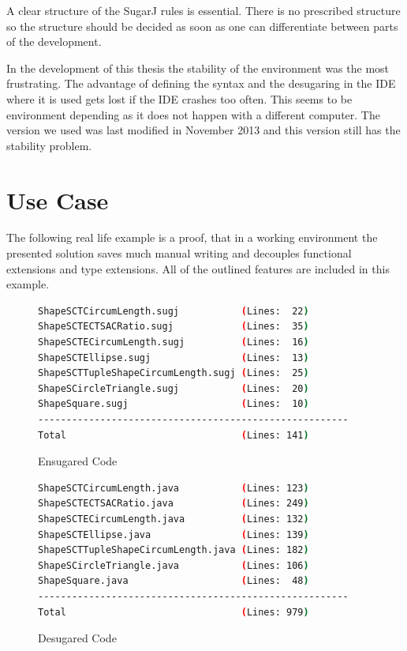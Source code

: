 \documentclass{report}
\begin{document}
A clear structure of the SugarJ rules is essential. There is no prescribed structure so the structure should be decided as soon as one can differentiate between parts of the development.

In the development of this thesis the stability of the environment was the most frustrating. The advantage of defining the syntax and the desugaring in the IDE where it is used gets lost if the IDE crashes too often. This seems to be environment depending as it does not happen with a different computer. The version we used was last modified in November 2013 and this version still has the stability problem.



\chapter{Use Case}

The following real life example is a proof, that in a working environment the presented solution saves much manual writing and decouples functional extensions and type extensions. All of the outlined features are included in this example.

\begin{figure}[h]
\begin{lstlisting}[language=bash,numbers=none]
ShapeSCTCircumLength.sugj           (Lines:  22)
ShapeSCTECTSACRatio.sugj            (Lines:  35)
ShapeSCTECircumLength.sugj          (Lines:  16)
ShapeSCTEllipse.sugj                (Lines:  13)
ShapeSCTTupleShapeCircumLength.sugj (Lines:  25)
ShapeSCircleTriangle.sugj           (Lines:  20)
ShapeSquare.sugj                    (Lines:  10)
-------------------------------------------------------
Total                               (Lines: 141)
\end{lstlisting}
\caption{Ensugared Code}
\end{figure}

\begin{figure}[h]
\begin{lstlisting}[language=bash,numbers=none]
ShapeSCTCircumLength.java           (Lines: 123)
ShapeSCTECTSACRatio.java            (Lines: 249)
ShapeSCTECircumLength.java          (Lines: 132)
ShapeSCTEllipse.java                (Lines: 139)
ShapeSCTTupleShapeCircumLength.java (Lines: 182)
ShapeSCircleTriangle.java           (Lines: 106)
ShapeSquare.java                    (Lines:  48)
-------------------------------------------------------
Total                               (Lines: 979)
\end{lstlisting}
\caption{Desugared Code}
\end{figure}
\end{document}
